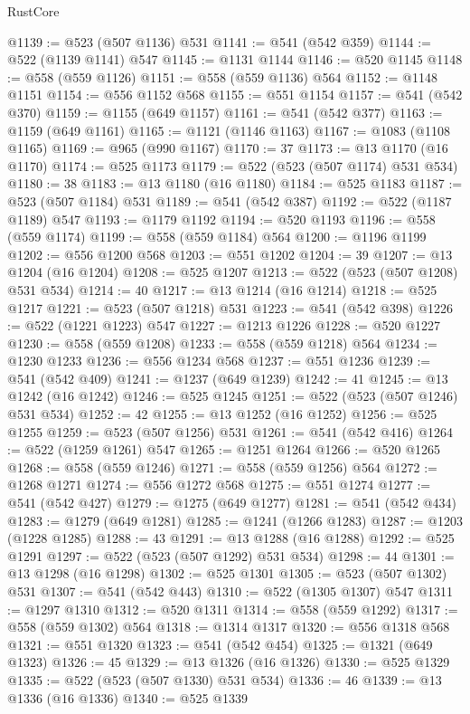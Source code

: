 \begin{lexlean}{RustCore}
\begin{coremodule}
@1139 := @523 (@507 @1136) @531
@1141 := @541 (@542 @359)
@1144 := @522 (@1139 @1141) @547
@1145 := @1131 @1144
@1146 := @520 @1145
@1148 := @558 (@559 @1126)
@1151 := @558 (@559 @1136) @564
@1152 := @1148 @1151
@1154 := @556 @1152 @568
@1155 := @551 @1154
@1157 := @541 (@542 @370)
@1159 := @1155 (@649 @1157)
@1161 := @541 (@542 @377)
@1163 := @1159 (@649 @1161)
@1165 := @1121 (@1146 @1163)
@1167 := @1083 (@1108 @1165)
@1169 := @965 (@990 @1167)
@1170 := 37
@1173 := @13 @1170 (@16 @1170)
@1174 := @525 @1173
@1179 := @522 (@523 (@507 @1174) @531 @534)
@1180 := 38
@1183 := @13 @1180 (@16 @1180)
@1184 := @525 @1183
@1187 := @523 (@507 @1184) @531
@1189 := @541 (@542 @387)
@1192 := @522 (@1187 @1189) @547
@1193 := @1179 @1192
@1194 := @520 @1193
@1196 := @558 (@559 @1174)
@1199 := @558 (@559 @1184) @564
@1200 := @1196 @1199
@1202 := @556 @1200 @568
@1203 := @551 @1202
@1204 := 39
@1207 := @13 @1204 (@16 @1204)
@1208 := @525 @1207
@1213 := @522 (@523 (@507 @1208) @531 @534)
@1214 := 40
@1217 := @13 @1214 (@16 @1214)
@1218 := @525 @1217
@1221 := @523 (@507 @1218) @531
@1223 := @541 (@542 @398)
@1226 := @522 (@1221 @1223) @547
@1227 := @1213 @1226
@1228 := @520 @1227
@1230 := @558 (@559 @1208)
@1233 := @558 (@559 @1218) @564
@1234 := @1230 @1233
@1236 := @556 @1234 @568
@1237 := @551 @1236
@1239 := @541 (@542 @409)
@1241 := @1237 (@649 @1239)
@1242 := 41
@1245 := @13 @1242 (@16 @1242)
@1246 := @525 @1245
@1251 := @522 (@523 (@507 @1246) @531 @534)
@1252 := 42
@1255 := @13 @1252 (@16 @1252)
@1256 := @525 @1255
@1259 := @523 (@507 @1256) @531
@1261 := @541 (@542 @416)
@1264 := @522 (@1259 @1261) @547
@1265 := @1251 @1264
@1266 := @520 @1265
@1268 := @558 (@559 @1246)
@1271 := @558 (@559 @1256) @564
@1272 := @1268 @1271
@1274 := @556 @1272 @568
@1275 := @551 @1274
@1277 := @541 (@542 @427)
@1279 := @1275 (@649 @1277)
@1281 := @541 (@542 @434)
@1283 := @1279 (@649 @1281)
@1285 := @1241 (@1266 @1283)
@1287 := @1203 (@1228 @1285)
@1288 := 43
@1291 := @13 @1288 (@16 @1288)
@1292 := @525 @1291
@1297 := @522 (@523 (@507 @1292) @531 @534)
@1298 := 44
@1301 := @13 @1298 (@16 @1298)
@1302 := @525 @1301
@1305 := @523 (@507 @1302) @531
@1307 := @541 (@542 @443)
@1310 := @522 (@1305 @1307) @547
@1311 := @1297 @1310
@1312 := @520 @1311
@1314 := @558 (@559 @1292)
@1317 := @558 (@559 @1302) @564
@1318 := @1314 @1317
@1320 := @556 @1318 @568
@1321 := @551 @1320
@1323 := @541 (@542 @454)
@1325 := @1321 (@649 @1323)
@1326 := 45
@1329 := @13 @1326 (@16 @1326)
@1330 := @525 @1329
@1335 := @522 (@523 (@507 @1330) @531 @534)
@1336 := 46
@1339 := @13 @1336 (@16 @1336)
@1340 := @525 @1339

\end{coremodule}
\end{lexlean}
